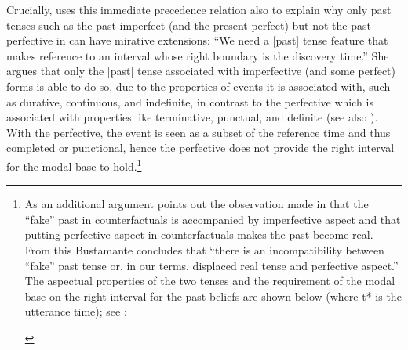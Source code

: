 \documentclass[output=paper]{langscibook}
\begin{document}
Crucially, \citet[112--114]{Bustamante2013} uses this immediate precedence relation also to explain why only past tenses such as the past imperfect (and the present perfect) but not the past perfective in  can have mirative extensions:
``We need a [past] tense feature that makes reference to an interval whose right boundary is the discovery time.''
She argues that only the [past] tense associated with imperfective (and some perfect) forms is able to do so, due to the properties of events it is associated with, such as durative, continuous, and indefinite, in contrast to the perfective which is associated with properties like terminative, punctual, and definite (see also \citealt[300]{Cipria.Roberts2000}). With the perfective, the event is seen as a subset of the reference time and thus completed or punctional, hence the perfective does not provide the right interval for the modal base to hold.\footnote{As an additional argument \citet[112--113]{Bustamante2013} points out the observation made in \citet{Iatridou2000} that the ``fake'' past in counterfactuals is accompanied by imperfective aspect and that putting perfective aspect in counterfactuals makes the past become real. From this Bustamante concludes that ``there is an incompatibility between ``fake'' past tense or, in our terms, displaced real tense and perfective aspect.'' The aspectual properties of the two tenses and the requirement of the modal base on the right interval for the past beliefs are shown below (where t* is the utterance time); see \citet[114]{Bustamante2013}:\\
\begin{center}
\end{center}
}
\end{document}
